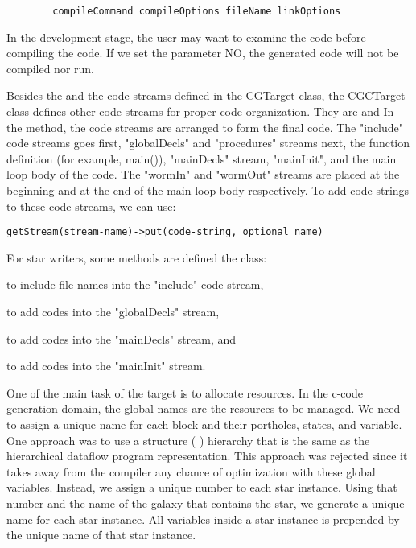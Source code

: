\begin{verbatim}
        compileCommand compileOptions fileName linkOptions
\end{verbatim}

In the development stage, the user may want to examine the code before
compiling the code. If we set the parameter
NO, the generated code will not be compiled nor run.

Besides the
and the
code streams defined in the CGTarget class, the CGCTarget class
defines other code streams for proper code organization.
They are 
and
In the 
method, the code streams are arranged to form the final code.
The "include" code streams goes first, "globalDecls" and
"procedures" streams next,
the function definition (for example, main()), "mainDecls" stream,
"mainInit", and the main loop body of the code. The "wormIn" and
"wormOut" streams are placed at the beginning and at the end of
the main loop body respectively.
To add code strings to these code streams, we can use:

\begin{verbatim}
getStream(stream-name)->put(code-string, optional name)
\end{verbatim}

For star writers, some methods are defined the 
class:

to include file names into the "include" code stream,

to add codes into the "globalDecls" stream,

to add codes into the "mainDecls" stream, and

to add codes into the "mainInit" stream.

One of the main task of the target is to allocate resources. In the c-code
generation domain, the global names are the resources to be managed.
We need to assign a unique name for each block and their portholes, states,
and variable. One approach was to use a structure (
) hierarchy that is the same as the hierarchical dataflow program
representation. This approach was rejected since it takes away from the 
compiler any chance of optimization with these global variables. 
Instead, we assign a unique number to each star instance. Using that number
and the name of the galaxy that contains the star, we generate a unique name
for each star instance. All variables inside a star instance is
prepended by the unique name of that star instance.

